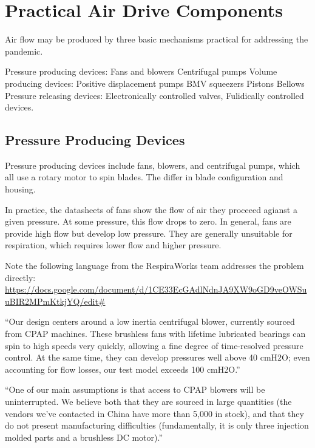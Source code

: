 \documentclass{article}
\begin{document}
\section{Practical Air Drive Components}

Air flow may be produced by three basic mechanisms practical for addressing the pandemic.

\begin{outline}
  \1 Pressure producing devices:
  \2 Fans and blowers
  \2 Centrifugal pumps
  \1 Volume producing devices:
  \2 Positive displacement pumps
  \2 BMV squeezers
  \2 Pistons
  \2 Bellows
  \1 Pressure releasing devices:
  \2 Electronically controlled valves,
  \2 Fulidically controlled devices.
\end{outline}


\subsection{Pressure Producing Devices}

Pressure producing devices include fans, blowers, and centrifugal pumps, which
all use a rotary motor to spin blades. The differ in blade configuration and
housing.

In practice, the datasheets of fans show the flow of air they proceeed agianst a given pressure. At some pressure,
this flow drops to zero. In general, fans are provide high flow but develop low pressure. They are generally unsuitable
for respiration, which requires lower flow and higher pressure.


Note the following language from the RespiraWorks team addresses the problem directly:
\url{https://docs.google.com/document/d/1CE33EcGAdlNdnJA9XW9oGD9veOWSuuBIR2MPmKtkjYQ/edit#}

``Our design centers around a low inertia centrifugal blower, currently sourced from CPAP machines. These brushless fans with lifetime lubricated bearings can spin to high speeds very quickly, allowing a fine degree of time-resolved pressure control. At the same time, they can develop pressures well above 40 cmH2O; even accounting for flow losses, our test model exceeds 100 cmH2O.''

``One of our main assumptions is that access to CPAP blowers will be uninterrupted. We believe both that they are sourced in large quantities (the vendors we’ve contacted in China have more than 5,000 in stock), and that they do not present manufacturing difficulties (fundamentally, it is only three injection molded parts and a brushless DC motor).''
\end{document}
